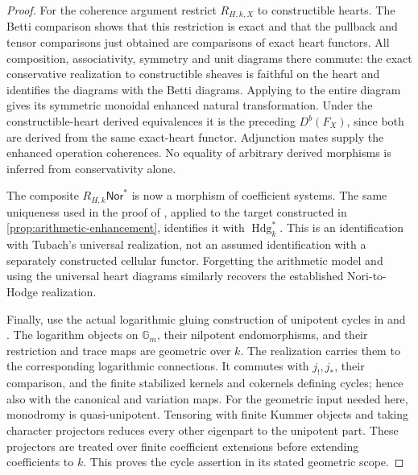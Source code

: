\documentclass[11pt]{article}
\numberwithin{equation}{section}
\theoremstyle{definition}
\theoremstyle{remark}
\newcommand{\Gm}{\mathbb G_m}
\begin{document}
\begin{proof}
For the coherence argument restrict $R_{H,k,X}$ to constructible
hearts. The Betti comparison shows that this restriction is exact and
that the pullback and tensor comparisons just obtained are comparisons
of exact heart functors. All composition, associativity, symmetry and
unit diagrams there commute: the exact conservative realization to
constructible sheaves is faithful on the heart and identifies the
diagrams with the Betti diagrams. Applying
\cite[Theorem~3.3 and Proposition~3.5]{Tubach} to the entire diagram
gives its symmetric monoidal enhanced natural transformation. Under
the constructible-heart derived equivalences it is the preceding
$D^b(F_X)$, since both are derived from the same exact-heart functor.
Adjunction mates supply the enhanced operation coherences. No equality
of arbitrary derived morphisms is inferred from conservativity alone.

The composite $R_{H,k}\mathsf{Nor}^*$ is now a morphism of coefficient
systems. The same uniqueness used in the proof of
\cite[Corollary~4.8]{Tubach}, applied to the target constructed in
\cref{prop:arithmetic-enhancement}, identifies it with
$\operatorname{Hdg}_k^*$. This is an identification with Tubach's
universal realization, not an assumed identification with a separately
constructed cellular functor. Forgetting the arithmetic model and using
the universal heart diagrams similarly recovers the established
Nori-to-Hodge realization.

Finally, use the actual logarithmic gluing construction of unipotent
cycles in \cite[\S3.5, Corollary~3.14]{IvorraMorel} and
\cite[\S5]{SaitoMixed}. The logarithm objects on $\Gm$, their nilpotent
endomorphisms, and their restriction and trace maps are geometric
over $k$. The realization carries them to the corresponding logarithmic
connections. It commutes with $j_!,j_*$, their comparison, and the
finite stabilized kernels and cokernels defining cycles; hence also
with the canonical and variation maps. For the geometric input needed
here, monodromy is quasi-unipotent. Tensoring with finite Kummer
objects and taking character projectors reduces every other eigenpart
to the unipotent part. These projectors are treated over finite
coefficient extensions before extending coefficients to $k$. This proves
the cycle assertion in its stated geometric scope.
\end{proof}
\end{document}

